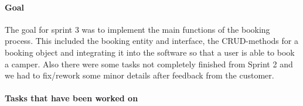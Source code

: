 \paragraph{Goal}
The goal for sprint 3 was to implement the main functions of the booking process.
This included the booking entity and interface, the CRUD-methods for a booking object and integrating it into the software so that a user is able to book a camper.
Also there were some tasks not completely finished from Sprint 2 and we had to fix/rework some minor details after feedback from the customer.
\paragraph{Tasks that have been worked on \newline \newline}

